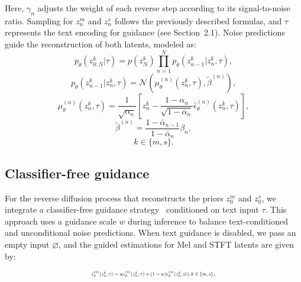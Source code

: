 \documentclass{IEEEtran}
\begin{document}
Here, \( \gamma_{n} \) adjusts the weight of each reverse step according to its signal-to-noise ratio. Sampling for \( z^{m}_{n} \) and \( z^{s}_{n} \) follows the previously described formulas, and \( \tau \) represents the text encoding for guidance (see Section~2.1). Noise predictions guide the reconstruction of both latents, modeled as:
\vspace{-0.5em}
\begin{equation}
p_{\theta}(z^{k}_{0:N} | \tau) = p(z^{k}_{N}) \prod_{n=1}^{N} p_{\theta}(z^{k}_{n-1} | z^{k}_{n}, \tau),
\end{equation}
\vspace{-0.5em}
\begin{equation}
p_{\theta}(z^{k}_{n-1} | z^{k}_{n}, \tau) = \mathcal{N}\left(\mu_{\theta}^{(n)}(z^{k}_{n}, \tau), \tilde{\beta}^{(n)}\right),
\end{equation}
\vspace{-0.5em}
\begin{equation}
\mu_{\theta}^{(n)}(z^{k}_{n}, \tau) = \frac{1}{\sqrt{\alpha_{n}}} \left[ z^{k}_{n} - \frac{1 - \alpha_{n}}{\sqrt{1 - \bar{\alpha}_{n}}} \hat{\epsilon}_{\theta}^{(n)}(z^{k}_{n}, \tau) \right],
\end{equation}
\vspace{-0.5em}
\begin{equation}
\tilde{\beta}^{(n)} = \frac{1 - \bar{\alpha}_{n-1}}{1 - \bar{\alpha}_{n}} \beta_{n},
\end{equation}
\vspace{-0.5em}
\[
k \in \{m,s\}.
\]




\subsection{Classifier-free guidance}



For the reverse diffusion process that reconstructs the priors \( z^{m}_{0} \) and \( z^{s}_{0} \), we integrate a classifier-free guidance strategy~\cite{ho2022classifier} conditioned on text input \( \tau \). This approach uses a guidance scale \( w \) during inference to balance text-conditioned and unconditional noise predictions. When text guidance is disabled, we pass an empty input \( \varnothing \), and the guided estimations for Mel and STFT latents are given by:

\vspace{-0.5em}
\begin{equation}
\resizebox{0.43\textwidth}{!}{$\hat{\epsilon}_{\theta}^{(n)}(z^{k}_{n}, \tau) = w \epsilon_{\theta}^{(n)}(z^{k}_{n}, \tau) + (1-w) \epsilon_{\theta}^{(n)}(z^{k}_{n}, \varnothing),k \in \{m,s\}$}.
\end{equation}
\end{document}
